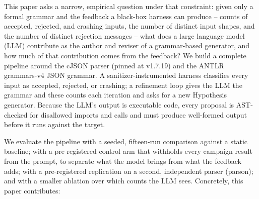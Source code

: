This paper asks a narrow, empirical question under that constraint: given
only a formal grammar and the feedback a black-box harness can produce --
counts of accepted, rejected, and crashing inputs, the number of distinct
input shapes, and the number of distinct rejection messages -- what does a
large language model (LLM) contribute as the author and reviser of a
grammar-based generator, and how much of that contribution comes from the
feedback? We build a complete pipeline around the cJSON parser (pinned at
v1.7.19) and the ANTLR grammars-v4 JSON grammar. A sanitizer-instrumented
harness classifies every input as accepted, rejected, or crashing; a
refinement loop gives the LLM the grammar and these counts each iteration
and asks for a new Hypothesis generator. Because the LLM's output is
executable code, every proposal is AST-checked for disallowed imports and
calls and must produce well-formed output before it runs against the
target.

We evaluate the pipeline with a seeded, fifteen-run comparison against a
static baseline; with a pre-registered control arm that withholds every
campaign result from the prompt, to separate what the model brings from
what the feedback adds; with a pre-registered replication on a second,
independent parser (parson); and with a smaller ablation over which counts
the LLM sees. Concretely, this paper contributes:

